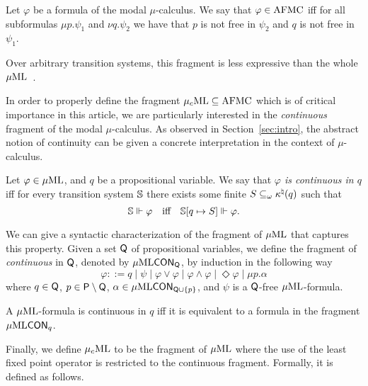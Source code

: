 \begin{definition}
  Let $\varphi$ be a formula of the modal $\mu$-calculus. We say that $\varphi\in\mathrm{AFMC}$ iff for all subformulas $\mu p.\psi_1$ and $\nu q.\psi_2$ we have that $p$ is not free in $\psi_2$ and $q$ is not free in $\psi_1$.
\end{definition}

Over arbitrary transition systems, this fragment is
less expressive than the whole $\mu\mathrm{ML}$~\cite{Park79}. %

In order to properly define the fragment $\mu_{c}\textup{ML} \subseteq \mathrm{AFMC}$ which is of critical importance in this article, we are particularly interested in the \emph{continuous} fragment of the modal $\mu$-calculus. As observed in Section~\ref{sec:intro}, the abstract notion of continuity can be given a concrete interpretation in the context of $\mu$-calculus.
%
\begin{definition}
Let $\varphi \in \mu\mathrm{ML}$, and $q$ be a propositional variable. We say that \emph{$\varphi$ is continuous in $q$} iff for every transition system $\mathbb{S}$ there exists some finite $S \subseteq_\omega \kappa^\natural(q)$ such that
$$
\model \mmodels \varphi \quad\text{iff}\quad \model[q \mapsto S] \mmodels \varphi .
$$
\end{definition}

We can give a syntactic characterization of the fragment of $\mu\mathrm{ML}$ that captures this property. Given a set $\mathsf{Q}$ of propositional variables, we define the fragment of \MC \emph{continuous} in $\mathsf{Q}$, denoted by $\mu\mathrm{ML}\mathsf{CON}_{\mathsf{Q}}$, by induction in the following way
\begin{equation*}
   \varphi ::= q
   \mid \psi
   \mid \varphi \lor \varphi
   \mid \varphi \land \varphi
   \mid \Diamond \varphi
   \mid \mu p.\alpha
\end{equation*}
%
where $q \in \mathsf{Q}$, $p \in \mathsf{P} \setminus \mathsf{Q}$, $\alpha \in \mu\mathrm{ML}\mathsf{CON}_{\mathsf{Q}\cup\{p\}}$, and $\psi$ is a $\mathsf{Q}$-free $\mu\mathrm{ML}$-formula.

\begin{proposition}\label{prop:FVcont}
A $\mu\mathrm{ML}$-formula is continuous in $q$ iff it is equivalent to a formula in the fragment $\mu\mathrm{ML}\mathsf{CON}_{q}$.
\end{proposition}

Finally, we define $\mu_{c}\textup{ML}$ to be the fragment of $\mu\mathrm{ML}$ where the use of the least fixed point operator is restricted to the continuous fragment. Formally, it is defined as follows.

